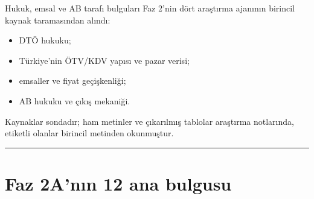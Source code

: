 \endgroup

Hukuk, emsal ve AB tarafı bulguları Faz 2'nin dört araştırma ajanının birincil kaynak taramasından alındı:

\begin{itemize}
\tightlist
\item
  DTÖ hukuku;
\item
  Türkiye'nin ÖTV/KDV yapısı ve pazar verisi;
\item
  emsaller ve fiyat geçişkenliği;
\item
  AB hukuku ve çıkış mekaniği.
\end{itemize}

Kaynaklar sondadır; ham metinler ve çıkarılmış tablolar araştırma notlarında, \etiketV{} etiketli olanlar birincil metinden okunmuştur.

\begin{center}\rule{0.5\linewidth}{0.5pt}\end{center}

\hypertarget{02a_politika_uzayi-faz-2anux131n-12-ana-bulgusu}{%
\section{Faz 2A'nın 12 ana bulgusu}\label{02a_politika_uzayi-faz-2anux131n-12-ana-bulgusu}}

